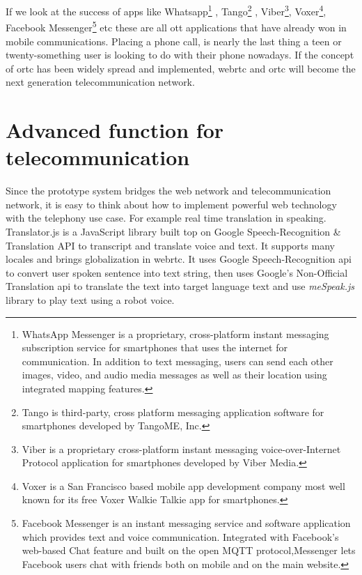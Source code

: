 \par If we look at the success of apps like Whatsapp\footnote{WhatsApp Messenger is a proprietary, cross-platform instant messaging subscription service for smartphones that uses the internet for communication. In addition to text messaging, users can send each other images, video, and audio media messages as well as their location using integrated mapping features.} , Tango\footnote{Tango is third-party, cross platform messaging application software for smartphones developed by TangoME, Inc.} , Viber\footnote{Viber is a proprietary cross-platform instant messaging voice-over-Internet Protocol application for smartphones developed by Viber Media.}, Voxer\footnote{Voxer is a San Francisco based mobile app development company most well known for its free Voxer Walkie Talkie app for smartphones.}, Facebook Messenger\footnote{Facebook Messenger is an instant messaging service and software application which provides text and voice communication. Integrated with Facebook's web-based Chat feature and built on the open MQTT protocol,Messenger lets Facebook users chat with friends both on mobile and on the main website.} etc these are all \gls{ott} applications that have already won in mobile communications. Placing a phone call, is nearly the last thing a teen or twenty-something user is looking to do with their phone nowadays.\cite{web:ott_com} If the concept of \gls{ortc} has been widely spread and implemented, \gls{webrtc} and \gls{ortc} will become the next generation telecommunication network.

\section{Advanced function for telecommunication}

\par Since the prototype system bridges the web network and telecommunication network, it is easy to think about how to implement powerful web technology with the telephony use case. For example real time translation in speaking. Translator.js is a JavaScript library built top on Google Speech-Recognition \& Translation API to transcript and translate voice and text. It supports many locales and brings globalization in \gls{webrtc}.\cite{github:translatorjs} It uses Google Speech-Recognition \gls{api} to convert user spoken sentence into text string, then uses Google's Non-Official Translation \gls{api} to translate the text into target language text and use \textit{meSpeak.js} library to play text using a robot voice.

